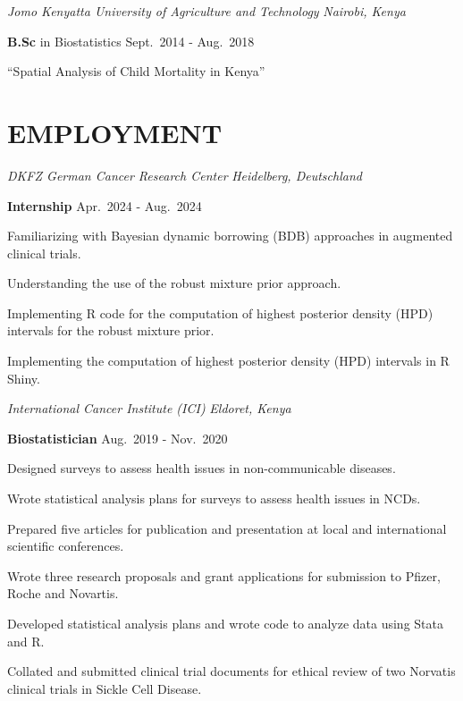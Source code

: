 \documentclass[13pt,]{article}
\providecommand{\tightlist}{%
  \setlength{\itemsep}{0pt}\setlength{\parskip}{0pt}}
\renewenvironment{itemize}{
  \begin{list}{}{
    \setlength{\leftmargin}{1.5em}
  }
}{
  \end{list}
}
\begin{document}
\emph{Jomo Kenyatta University of Agriculture and Technology}
\hfill \emph{Nairobi, Kenya}

\begin{itemize}
\item
  \textbf{B.Sc} in Biostatistics \hfill Sept.~2014 - Aug.~2018

  \begin{itemize}
  \tightlist
  \item
    ``Spatial Analysis of Child Mortality in Kenya''
  \end{itemize}
\end{itemize}

\section{\texorpdfstring{\textbf{EMPLOYMENT}}{EMPLOYMENT}}\label{employment}

\emph{DKFZ German Cancer Research Center} \hfill \emph{Heidelberg,
Deutschland}

\textbf{Internship} \hfill Apr.~2024 - Aug.~2024

\begin{itemize}
\tightlist
\item
  Familiarizing with Bayesian dynamic borrowing (BDB) approaches in
  augmented clinical trials.
\item
  Understanding the use of the robust mixture prior approach.
\item
  Implementing R code for the computation of highest posterior density
  (HPD) intervals for the robust mixture prior.
\item
  Implementing the computation of highest posterior density (HPD)
  intervals in R Shiny.
\end{itemize}

\emph{International Cancer Institute (ICI)} \hfill \emph{Eldoret, Kenya}

\textbf{Biostatistician} \hfill Aug.~2019 - Nov.~2020

\begin{itemize}
\tightlist
\item
  Designed surveys to assess health issues in non-communicable diseases.
\item
  Wrote statistical analysis plans for surveys to assess health issues
  in NCDs.
\item
  Prepared five articles for publication and presentation at local and
  international scientific conferences.
\item
  Wrote three research proposals and grant applications for submission
  to Pfizer, Roche and Novartis.
\item
  Developed statistical analysis plans and wrote code to analyze data
  using Stata and R.
\item
  Collated and submitted clinical trial documents for ethical review of
  two Norvatis clinical trials in Sickle Cell Disease.
\end{itemize}
\end{document}

